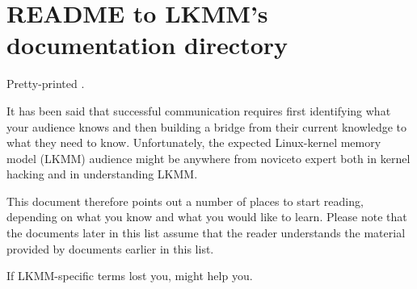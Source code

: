 \section{README to LKMM's documentation directory}

\begin{Note}
  Pretty-printed .
\end{Note}

It has been said that successful communication requires first identifying
what your audience knows and then building a bridge from their current
knowledge to what they need to know.
Unfortunately, the expected Linux-kernel memory model (LKMM) audience
might be anywhere from noviceto expert both in kernel hacking and in
understanding LKMM.

This document therefore points out a number of places to start reading,
depending on what you know and what you would like to learn.
Please note that the documents later in this list assume that the reader
understands the material provided by documents earlier in this list.

If LKMM-specific terms lost you,
\hyperref[sec:docs:Glossaries to LKMM]{}
might help you.

